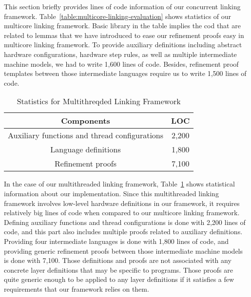 This section briefly provides lines of code information of our concurrent linking framework. 
Table~\ref{table:multicore-linking-evaluation} shows statistics of our multicore  linking framework. 
Basic library in the table implies the cod that are related to lemmas that we have introduced to ease our refinement proofs easy in multicore linking framework. 
To provide auxiliary definitions including abstract hardware configurations, hardware step rules, as well as multiple intermediate machine models, we had to write 1,600 lines of code.
Besides, refinement proof templates between those intermediate languages require us to write 1,500 lines of code. 
\begin{table}
\begin{center}
\renewcommand{\arraystretch}{1.1}
\setlength{\tabcolsep}{0.3em}
\begin{tabular}{|c|c|}
\hline
Components  & LOC\\
\hline
\hline
Auxiliary functions and thread configurations & 2,200 \\
\hline
Language definitions & 1,800 \\
\hline
Refinement proofs & 7,100 \\
\hline
\end{tabular}
\end{center}
\caption{Statistics for Multithreqded Linking Framework}
\label{table:multithreaded-linking-evaluation}
\hrulefill
\end{table}
In the case of our multithreaded linking framework, Table~\ref{table:multithreaded-linking-evaluation} shows statistical information about our implementation. 
Since this multithreaded linking framework involves low-level hardware definitions in our framework, it requires relatively big lines of code when compared to our multicore linking framework. 
Defining auxiliary functions and thread configurations is done with 2,200 lines of code, and this part also includes multiple proofs related to auxiliary definitions. 
Providing four intermediate languages is done with   1,800 lines of code, and providing generic refinement proofs between those intermediate machine models is done with 7,100. 
Those definitions and proofs are not associated with any concrete layer definitions that may be specific to programs. 
Those proofs are quite generic enough to be applied to any layer definitions if it satisfies a few requirements that our framework relies on them.


